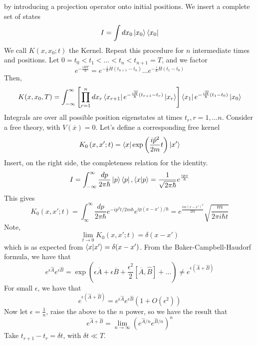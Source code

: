 \documentclass[11pt, oneside]{article}   	%
\theoremstyle{slanted}
\newcommand{\planck}{\hbar}
\begin{document}
by introducing a projection operator 
onto initial positions. 
We insert a complete set of states 
\[
 I = \int dx_0 \ket{ x_0 }\bra{ x_0 } 
\] 
We call $ K ( x, x_0; t ) $ the Kernel. 
Repeat this procedure for $ n $ intermediate 
times and positions. 
Let $ 0 = t_0 < t_1 < \dots < t_ n < t _{ n + 1 }  = T $, 
and we factor 
\[
	e^{ -\frac{i H T }{ \planck } }  = e ^{  - \frac{i}{\planck } \overline{ H } \left( 
	t _{ n +1 }  -  t_ n \right)  } \dots e^{  - \frac{ i }{ \planck } \overline{ H } \left( 
	t_1 - t_0 \right)  }
\] Then, 
\[
	K ( x, x_0 ,T ) = \int_{  - \infty } ^{ \infty } \left[  
	\prod_{ r = 1 }^ n dx _ r \bra{ x_{ r + 1 } } 
e ^{ - \frac{ i \overline{ H } }{ \planck } \left( t _{ r + 1 }  - t_ r  \right)  } 
\ket{ x _ r } \right]  \bra{ x _1} e ^{   - \frac{ i \overline{ H } }{ \planck} \left( 
t_1 - t_0 \right)  }\ket{ x_0 } 
\] Integrals are over all possible 
position eigenstates at times 
$ t_ r , r = 1 , \dots n $. 
Consider a free theory, with $ V ( \overline{ x } ) = 0 $. 
Let's define a corresponding free kernel
\[
	K _ 0 \left( x, x' ; t  \right)  = \bra{ x }\exp\left( \frac{i \hat{p }^ 2   }{2m }t \right)
	\ket{ x' } 
\]  Insert, on the right side, the completeness relation 
for the identity. 
\[
 I  = \int_{  - \infty }^{ \infty } \frac{ dp }{ 2 \pi \planck } \ket{ p }\bra{ p }, 
 \bra{ x }\ket{ p }  = \frac{1}{ \sqrt{ 2 \pi \planck }  } e ^{ \frac{ i p x }{ \planck }}
\] This gives 
\[
	K_0 \left( x, x ' ; t  \right)   = 
	\int_{ \infty } ^{ \infty } \frac{ dp }{ 2 \pi \planck } e ^{  - i p ^ 2 t / 
	2m \planck  } e ^{ i p ( x - x ') / \planck}  = 
	e ^{ \frac{ im ( x - x ' ) ^ 2 }{ 2 \planck t } } \sqrt{ \frac{ m }{ 2 \pi i 
	\planck t}} 
\] Note, 
\[
	\lim_{ t \to 0 } K_ 0 \left( x, x ' ; t  \right)   =\delta ( x   - x ' ) 
\] which is as expected from $ \bra{ x }\ket{ x ' }  = \delta ( x   - x ' ) $. 
From the Baker-Campbell-Haudorf formula, 
we have that 
\[
 e ^{ \epsilon \hat{A } }e^{ \epsilon \hat{B } } = 
 \exp\left( \epsilon \overline{ A } + \epsilon \overline{ B }  + \frac{ \epsilon ^ 2 }{2 } 
 \left[  \overline{ A}, \hat{ B } \right] + \dots \right) \neq e ^{ \epsilon \left( 
 \hat{ A } + \hat{ B }\right) } 
\] For small $ \epsilon $, we have that 
\[
	e ^{ \epsilon ( \hat{ A  } + \hat{ B } ) } = e^{ \epsilon \hat{ A   } }e ^{ \epsilon \hat{ B } } \left(  1 + O ( \epsilon ^ 2 )  \right)
\] Now let $ \epsilon = \frac{1}{n } $, raise the above to the $ n $ power, 
so we have the result that 
\[
	e ^{ \hat{ A } + \hat{ B }  } = \lim_{ n \to \infty } \left( 
	e ^{ \hat{ A } / n } e ^{ \hat{B } / n  }\right) ^ n 
\] Take $ t _{  r + 1 }  - t_ r  = \delta t $, with $ \delta t \ll T $. 
\end{document}
